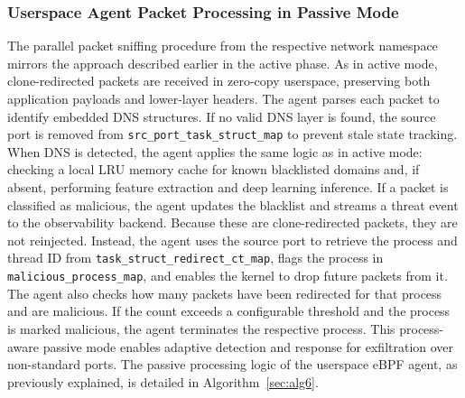 \documentclass [11pt, proquest] {uwthesis}[2020/02/24]
\begin{document}

\subsubsection{Userspace Agent Packet Processing in Passive Mode}
\label{passive:sec2}
The parallel packet sniffing procedure from the respective network namespace mirrors the approach described earlier in the active phase. As in active mode, clone-redirected packets are received in zero-copy userspace, preserving both application payloads and lower-layer headers. The agent parses each packet to identify embedded DNS structures. If no valid DNS layer is found, the source port is removed from \texttt{src\_port\_task\_struct\_map} to prevent stale state tracking. When DNS is detected, the agent applies the same logic as in active mode: checking a local LRU memory cache for known blacklisted domains and, if absent, performing feature extraction and deep learning inference.
If a packet is classified as malicious, the agent updates the blacklist and streams a threat event to the observability backend. Because these are clone-redirected packets, they are not reinjected. Instead, the agent uses the source port to retrieve the process and thread ID from \texttt{task\_struct\_redirect\_ct\_map}, flags the process in \texttt{malicious\_process\_map}, and enables the kernel to drop future packets from it. The agent also checks how many packets have been redirected for that process and are malicious. If the count exceeds a configurable threshold and the process is marked malicious, the agent terminates the respective process.
This process-aware passive mode enables adaptive detection and response for exfiltration over non-standard ports. The passive processing logic of the userspace eBPF agent, as previously explained, is detailed in Algorithm~\ref{sec:alg6}.
\end{document}
